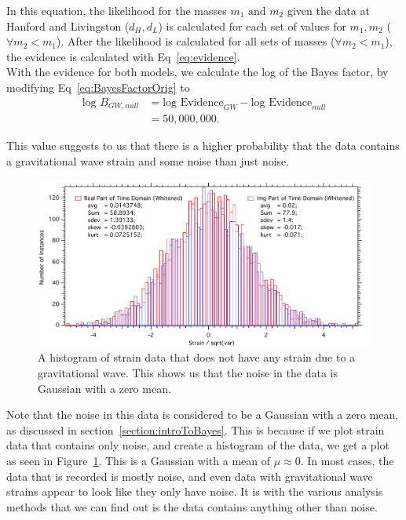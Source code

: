 \documentclass{article}
\begin{document}
 
 In this equation, the likelihood for the masses $m_1 \text{ and } m_2$ given the data at Hanford and Livingston ($d_H, d_L$) is calculated for each set of values for $m_1,m_2$ ($\forall m_2 < m_1$). After the likelihood is calculated for all sets of masses ($\forall m_2 < m_1$), the evidence is calculated with Eq~\ref{eq:evidence}.\\
 
 
 With the evidence for both models, we calculate the log of the Bayes factor, by modifying Eq~\ref{eq:BayesFactorOrig} to 
 \begin{align*}
\text{log }B_{GW,null} &= \text{log Evidence}_{GW} - \text{log Evidence}_{null} \\
&= 50,000,000.
 \end{align*}
 
  This value suggests to us that there is a higher probability that the data contains a gravitational wave strain and some noise than just noise.\\ 
 
 
    \begin{figure}[h]
    	\centering
    	\includegraphics[width=1\textwidth]{Figures/NoiseHistogram.pdf} 
    	\caption{A histogram of strain data that does not have any strain due to a gravitational wave. This shows us that the noise in the data is Gaussian with a zero mean.}
    	\label{Fig:NoiseHist}
    \end{figure}
    
 
 Note that the noise in this data is considered to be a Gaussian with a zero mean, as discussed in section~\ref{section:introToBayes}. This is because if we plot strain data that contains only noise, and create a histogram of the data, we get a plot as seen in Figure~\ref{Fig:NoiseHist}. This is a Gaussian with a mean of $\mu \approx 0$. In most cases, the data that is recorded is mostly noise, and even data with gravitational wave strains appear to look like they only have noise. It is with the various analysis methods that we can find out is the data contains anything other than noise.\\
  
\end{document}
